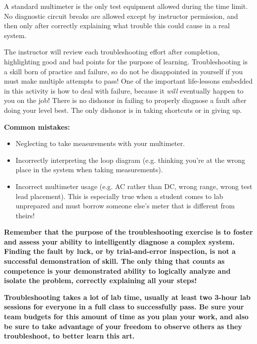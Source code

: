 A standard multimeter is the only test equipment allowed during the time limit.  No diagnostic circuit breaks are allowed except by instructor permission, and then only after correctly explaining what trouble this could cause in a real system.  

The instructor will review each troubleshooting effort after completion, highlighting good and bad points for the purpose of learning.  Troubleshooting is a skill born of practice and failure, so do not be disappointed in yourself if you must make multiple attempts to pass!  One of the important life-lessons embedded in this activity is how to deal with failure, because it {\it will} eventually happen to you on the job!  There is no dishonor in failing to properly diagnose a fault after doing your level best.  The only dishonor is in taking shortcuts or in giving up.

\vskip 10pt

{\bf Common mistakes:}

\begin{itemize}
\item{} Neglecting to take measurements with your multimeter.
\item{} Incorrectly interpreting the loop diagram (e.g. thinking you're at the wrong place in the system when taking measurements).
\item{} Incorrect multimeter usage (e.g. AC rather than DC, wrong range, wrong test lead placement).  This is especially true when a student comes to lab unprepared and must borrow someone else's meter that is different from theirs!
\end{itemize}

\vskip 10pt

{\bf Remember that the purpose of the troubleshooting exercise is to foster and assess your ability to intelligently diagnose a complex system.  Finding the fault by luck, or by trial-and-error inspection, is not a successful demonstration of skill.  The only thing that counts as competence is your demonstrated ability to logically analyze and isolate the problem, correctly explaining all your steps!}

\vskip 10pt

{\bf Troubleshooting takes a lot of lab time, usually at least two 3-hour lab sessions for everyone in a full class to successfully pass.  Be sure your team budgets for this amount of time as you plan your work, and also be sure to take advantage of your freedom to observe others as they troubleshoot, to better learn this art.}




